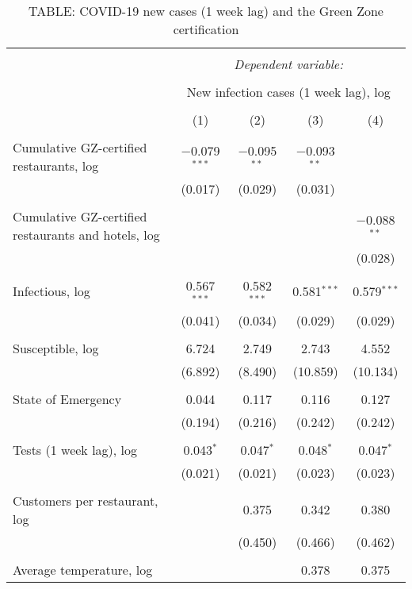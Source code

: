 
\begin{table}[!htbp] \centering 
  \caption{TABLE: COVID-19 new cases (1 week lag) and the Green Zone certification} 
  \label{} 
\begin{tabular}{@{\extracolsep{5pt}}lcccc} 
\\[-1.8ex]\hline 
\hline \\[-1.8ex] 
 & \multicolumn{4}{c}{\textit{Dependent variable:}} \\ 
\cline{2-5} 
\\[-1.8ex] & \multicolumn{4}{c}{New infection cases (1 week lag), log} \\ 
\\[-1.8ex] & (1) & (2) & (3) & (4)\\ 
\hline \\[-1.8ex] 
 Cumulative GZ-certified restaurants, log & $-$0.079$^{***}$ & $-$0.095$^{**}$ & $-$0.093$^{**}$ &  \\ 
  & (0.017) & (0.029) & (0.031) &  \\ 
  & & & & \\ 
 Cumulative GZ-certified restaurants and hotels, log &  &  &  & $-$0.088$^{**}$ \\ 
  &  &  &  & (0.028) \\ 
  & & & & \\ 
 Infectious, log & 0.567$^{***}$ & 0.582$^{***}$ & 0.581$^{***}$ & 0.579$^{***}$ \\ 
  & (0.041) & (0.034) & (0.029) & (0.029) \\ 
  & & & & \\ 
 Susceptible, log & 6.724 & 2.749 & 2.743 & 4.552 \\ 
  & (6.892) & (8.490) & (10.859) & (10.134) \\ 
  & & & & \\ 
 State of Emergency & 0.044 & 0.117 & 0.116 & 0.127 \\ 
  & (0.194) & (0.216) & (0.242) & (0.242) \\ 
  & & & & \\ 
 Tests (1 week lag), log & 0.043$^{*}$ & 0.047$^{*}$ & 0.048$^{*}$ & 0.047$^{*}$ \\ 
  & (0.021) & (0.021) & (0.023) & (0.023) \\ 
  & & & & \\ 
 Customers per restaurant, log &  & 0.375 & 0.342 & 0.380 \\ 
  &  & (0.450) & (0.466) & (0.462) \\ 
  & & & & \\ 
 Average temperature, log &  &  & 0.378 & 0.375 \\ 

\end{tabular}
\end{table}
